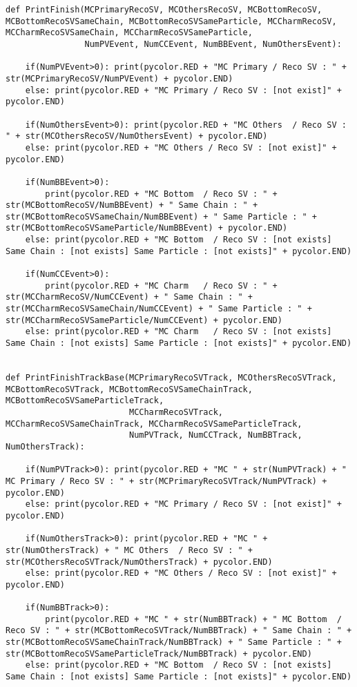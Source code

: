 \begin{lstlisting}[caption=崩壊点検出アルゴリズム用関数,label=VertexFinder1]
def PrintFinish(MCPrimaryRecoSV, MCOthersRecoSV, MCBottomRecoSV, MCBottomRecoSVSameChain, MCBottomRecoSVSameParticle, MCCharmRecoSV, MCCharmRecoSVSameChain, MCCharmRecoSVSameParticle,
                NumPVEvent, NumCCEvent, NumBBEvent, NumOthersEvent):

    if(NumPVEvent>0): print(pycolor.RED + "MC Primary / Reco SV : " + str(MCPrimaryRecoSV/NumPVEvent) + pycolor.END)
    else: print(pycolor.RED + "MC Primary / Reco SV : [not exist]" + pycolor.END)

    if(NumOthersEvent>0): print(pycolor.RED + "MC Others  / Reco SV : " + str(MCOthersRecoSV/NumOthersEvent) + pycolor.END)
    else: print(pycolor.RED + "MC Others / Reco SV : [not exist]" + pycolor.END)

    if(NumBBEvent>0):
        print(pycolor.RED + "MC Bottom  / Reco SV : " + str(MCBottomRecoSV/NumBBEvent) + " Same Chain : " + str(MCBottomRecoSVSameChain/NumBBEvent) + " Same Particle : " + str(MCBottomRecoSVSameParticle/NumBBEvent) + pycolor.END)
    else: print(pycolor.RED + "MC Bottom  / Reco SV : [not exists] Same Chain : [not exists] Same Particle : [not exists]" + pycolor.END)

    if(NumCCEvent>0):
        print(pycolor.RED + "MC Charm   / Reco SV : " + str(MCCharmRecoSV/NumCCEvent) + " Same Chain : " + str(MCCharmRecoSVSameChain/NumCCEvent) + " Same Particle : " + str(MCCharmRecoSVSameParticle/NumCCEvent) + pycolor.END)
    else: print(pycolor.RED + "MC Charm   / Reco SV : [not exists] Same Chain : [not exists] Same Particle : [not exists]" + pycolor.END)


def PrintFinishTrackBase(MCPrimaryRecoSVTrack, MCOthersRecoSVTrack, MCBottomRecoSVTrack, MCBottomRecoSVSameChainTrack, MCBottomRecoSVSameParticleTrack, 
                         MCCharmRecoSVTrack, MCCharmRecoSVSameChainTrack, MCCharmRecoSVSameParticleTrack,
                         NumPVTrack, NumCCTrack, NumBBTrack, NumOthersTrack):

    if(NumPVTrack>0): print(pycolor.RED + "MC " + str(NumPVTrack) + " MC Primary / Reco SV : " + str(MCPrimaryRecoSVTrack/NumPVTrack) + pycolor.END)
    else: print(pycolor.RED + "MC Primary / Reco SV : [not exist]" + pycolor.END)

    if(NumOthersTrack>0): print(pycolor.RED + "MC " + str(NumOthersTrack) + " MC Others  / Reco SV : " + str(MCOthersRecoSVTrack/NumOthersTrack) + pycolor.END)
    else: print(pycolor.RED + "MC Others / Reco SV : [not exist]" + pycolor.END)

    if(NumBBTrack>0):
        print(pycolor.RED + "MC " + str(NumBBTrack) + " MC Bottom  / Reco SV : " + str(MCBottomRecoSVTrack/NumBBTrack) + " Same Chain : " + str(MCBottomRecoSVSameChainTrack/NumBBTrack) + " Same Particle : " + str(MCBottomRecoSVSameParticleTrack/NumBBTrack) + pycolor.END)
    else: print(pycolor.RED + "MC Bottom  / Reco SV : [not exists] Same Chain : [not exists] Same Particle : [not exists]" + pycolor.END)


\end{lstlisting}
